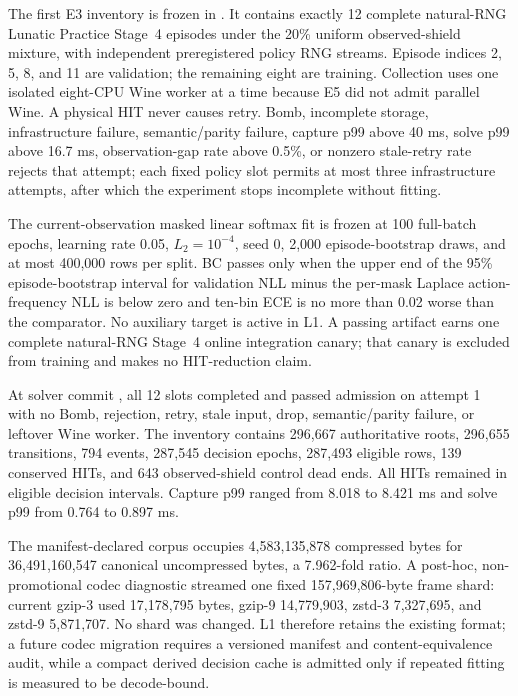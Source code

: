 \documentclass[11pt]{article}
\begin{document}
The first E3 inventory is frozen in
.  It contains exactly 12 complete
natural-RNG Lunatic Practice Stage~4 episodes under the 20\% uniform
observed-shield mixture, with independent preregistered policy RNG streams.
Episode indices 2, 5, 8, and 11 are validation; the remaining eight are
training.  Collection uses one isolated eight-CPU Wine worker at a time because
E5 did not admit parallel Wine.  A physical HIT never causes retry.  Bomb,
incomplete storage, infrastructure failure, semantic/parity failure, capture
p99 above 40 ms, solve p99 above 16.7 ms, observation-gap rate above 0.5\%, or
nonzero stale-retry rate rejects that attempt; each fixed policy slot permits
at most three infrastructure attempts, after which the experiment stops
incomplete without fitting.

The current-observation masked linear softmax fit is frozen at 100 full-batch
epochs, learning rate 0.05, $L_2=10^{-4}$, seed 0, 2,000 episode-bootstrap
draws, and at most 400,000 rows per split.  BC passes only when the upper end of
the 95\% episode-bootstrap interval for validation NLL minus the per-mask
Laplace action-frequency NLL is below zero and ten-bin ECE is no more than
0.02 worse than the comparator.  No auxiliary target is active in L1.  A
passing artifact earns one complete natural-RNG Stage~4 online integration
canary; that canary is excluded from training and makes no HIT-reduction claim.

At solver commit
, all 12 slots completed and
passed admission on attempt 1 with no Bomb, rejection, retry, stale input,
drop, semantic/parity failure, or leftover Wine worker.  The inventory contains
296,667 authoritative roots, 296,655 transitions, 794 events, 287,545 decision
epochs, 287,493 eligible rows, 139 conserved HITs, and 643 observed-shield
control dead ends.  All HITs remained in eligible decision intervals.  Capture
p99 ranged from 8.018 to 8.421 ms and solve p99 from 0.764 to 0.897 ms.

The manifest-declared corpus occupies 4,583,135,878 compressed bytes for
36,491,160,547 canonical uncompressed bytes, a 7.962-fold ratio.  A post-hoc,
non-promotional codec diagnostic streamed one fixed 157,969,806-byte frame
shard: current gzip-3 used 17,178,795 bytes, gzip-9 14,779,903, zstd-3
7,327,695, and zstd-9 5,871,707.  No shard was changed.  L1 therefore retains
the existing format; a future codec migration requires a versioned manifest
and content-equivalence audit, while a compact derived decision cache is
admitted only if repeated fitting is measured to be decode-bound.
\end{document}
